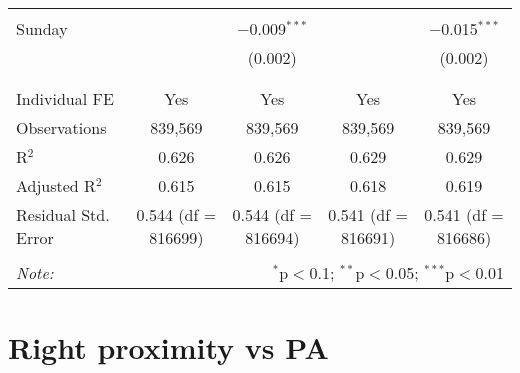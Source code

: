 \documentclass[
]{article}
\begin{document}
\begin{table}[!htbp]
{\begin{tabular}{@{\extracolsep{5pt}}lcccc}
  & & & & \\ 
 Sunday &  & $-$0.009$^{***}$ &  & $-$0.015$^{***}$ \\ 
  &  & (0.002) &  & (0.002) \\ 
  & & & & \\ 
\hline \\[-1.8ex] 
Individual FE & Yes & Yes & Yes & Yes \\ 
Observations & 839,569 & 839,569 & 839,569 & 839,569 \\ 
R$^{2}$ & 0.626 & 0.626 & 0.629 & 0.629 \\ 
Adjusted R$^{2}$ & 0.615 & 0.615 & 0.618 & 0.619 \\ 
Residual Std. Error & 0.544 (df = 816699) & 0.544 (df = 816694) & 0.541 (df = 816691) & 0.541 (df = 816686) \\ 
\hline 
\hline \\[-1.8ex] 
\textit{Note:}  & \multicolumn{4}{r}{$^{*}$p$<$0.1; $^{**}$p$<$0.05; $^{***}$p$<$0.01} \\ 
\end{tabular}
} 
\end{table} 
\newpage
\section{Right proximity vs PA}
\end{document}
